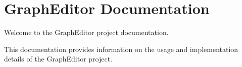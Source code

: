 \chapter{Graph\+Editor Documentation}
\hypertarget{index}{}\label{index}
Welcome to the Graph\+Editor project documentation.

This documentation provides information on the usage and implementation details of the Graph\+Editor project. 